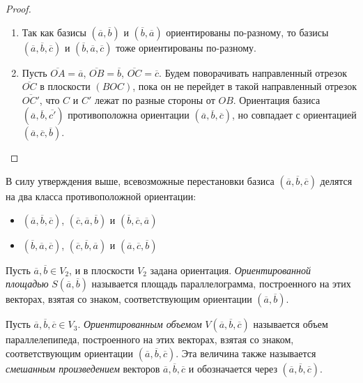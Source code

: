 \begin{proof}~
	\begin{enumerate}
		\item Так как базисы $(\overline{a}, \overline{b})$ и $(\overline{b}, \overline{a})$ ориентированы по-разному, то базисы $(\overline{a}, \overline{b}, \overline{c})$ и $(\overline{b}, \overline{a}, \overline{c})$ тоже ориентированы по-разному. \pagebreak
		\item Пусть $\overline{OA} = \overline{a}$, $\overline{OB} = \overline{b}$, $\overline{OC} = \overline{c}$. Будем поворачивать направленный отрезок $\overline{OC}$ в плоскости $(BOC)$, пока он не перейдет в такой направленный отрезок $\overline{OC'}$, что $C$ и $C'$ лежат по разные стороны от $OB$. Ориентация базиса $(\overline{a}, \overline{b}, \overline{c'})$ противоположна ориентации $(\overline{a}, \overline{b}, \overline{c})$, но совпадает с ориентацией $(\overline{a}, \overline{c}, \overline{b})$.\qedhere
	\end{enumerate}
\end{proof}

\begin{note}
	В силу утверждения выше, всевозможные перестановки базиса $(\overline{a}, \overline{b}, \overline{c})$ делятся на два класса противоположной ориентации:
	\begin{itemize}
		\item $(\overline{a}, \overline{b}, \overline{c})$, $(\overline{c}, \overline{a}, \overline{b})$ и $(\overline{b}, \overline{c}, \overline{a})$
		\item $(\overline{b}, \overline{a}, \overline{c})$, $(\overline{c}, \overline{b}, \overline{a})$ и $(\overline{a}, \overline{c}, \overline{b})$
	\end{itemize}
\end{note}

\begin{definition}
	Пусть $\overline{a}, \overline{b} \in V_2$, и в плоскости $V_2$ задана ориентация. \textit{Ориентированной площадью} $S(\overline{a}, \overline{b})$ называется площадь параллелограмма, построенного на этих векторах, взятая со знаком, соответствующим ориентации $(\overline{a}, \overline{b})$.
\end{definition}

\begin{definition}
	Пусть $\overline{a}, \overline{b}, \overline{c} \in V_3$. \textit{Ориентированным объемом} $V(\overline{a}, \overline{b}, \overline{c})$ называется объем параллелепипеда, построенного на этих векторах, взятая со знаком, соответствующим ориентации $(\overline{a}, \overline{b}, \overline{c})$. Эта величина также называется \textit{смешанным произведением} векторов $\overline{a}, \overline{b}, \overline{c}$ и обозначается через $(\overline{a}, \overline{b}, \overline{c})$.
\end{definition}

